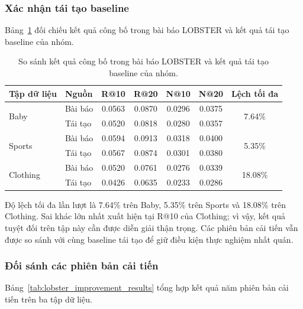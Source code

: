 \subsubsection{Xác nhận tái tạo baseline}

Bảng~\ref{tab:lobster_paper_vs_baseline} đối chiếu kết quả công bố trong bài báo LOBSTER và kết quả tái tạo baseline của nhóm.

\begingroup
\fontsize{8.5}{10}\selectfont
\setlength{\tabcolsep}{3pt}
\renewcommand{\arraystretch}{1.15}
\begin{table}[H]
\centering
\caption{So sánh kết quả công bố trong bài báo LOBSTER và kết quả tái tạo baseline của nhóm.}
\label{tab:lobster_paper_vs_baseline}
\begin{tabular}{l l *{4}{c} c}
\toprule
\rowcolor{gray!15}
\textbf{Tập dữ liệu} & \textbf{Nguồn} & \textbf{R@10} & \textbf{R@20} & \textbf{N@10} & \textbf{N@20} & \textbf{Lệch tối đa} \\
\midrule
\multirow{2}{*}{Baby}
 & Bài báo & 0.0563 & 0.0870 & 0.0296 & 0.0375 & \multirow{2}{*}{7.64\%} \\
 & Tái tạo & 0.0520 & 0.0818 & 0.0280 & 0.0357 & \\
\midrule
\multirow{2}{*}{Sports}
 & Bài báo & 0.0594 & 0.0913 & 0.0318 & 0.0400 & \multirow{2}{*}{5.35\%} \\
 & Tái tạo & 0.0567 & 0.0874 & 0.0301 & 0.0380 & \\
\midrule
\multirow{2}{*}{Clothing}
 & Bài báo & 0.0520 & 0.0761 & 0.0276 & 0.0339 & \multirow{2}{*}{18.08\%} \\
 & Tái tạo & 0.0426 & 0.0635 & 0.0233 & 0.0286 & \\
\bottomrule
\end{tabular}
\end{table}
\endgroup

Độ lệch tối đa lần lượt là 7.64\% trên Baby, 5.35\% trên Sports và 18.08\% trên Clothing. Sai khác lớn nhất xuất hiện tại R@10 của Clothing; vì vậy, kết quả tuyệt đối trên tập này cần được diễn giải thận trọng. Các phiên bản cải tiến vẫn được so sánh với cùng baseline tái tạo để giữ điều kiện thực nghiệm nhất quán.


\subsubsection{Đối sánh các phiên bản cải tiến}

Bảng~\ref{tab:lobster_improvement_results} tổng hợp kết quả năm phiên bản cải tiến trên ba tập dữ liệu.

